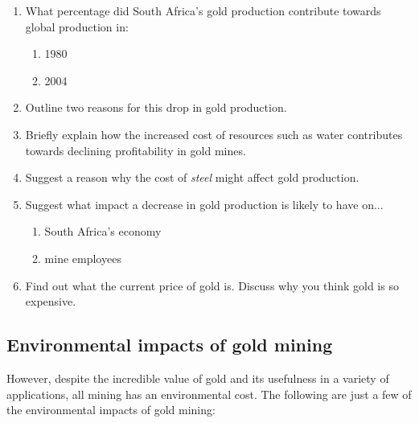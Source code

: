 {\begin{enumerate}
{Draw a line graph to illustrate these statistics.}

\item{What percentage did South Africa's gold production contribute towards global production in:
\begin{enumerate}
\item{1980}
\item{2004}
\end{enumerate}
}
\item{Outline two reasons for this drop in gold production.}
\item{Briefly explain how the increased cost of resources such as water contributes towards declining profitability in gold mines.}
\item{Suggest a reason why the cost of \textit{steel} might affect gold production.}
\item{Suggest what impact a decrease in gold production is likely to have on...
\begin{enumerate}
\item{South Africa's economy}
\item{mine employees}
\end{enumerate}
}
\item{Find out what the current price of gold is. Discuss why you think gold is so expensive.}

\end{enumerate}
}

\subsection{Environmental impacts of gold mining}
However, despite the incredible value of gold and its usefulness in a variety of applications, all mining has an environmental cost. The following are just a few of the environmental impacts of gold mining:

